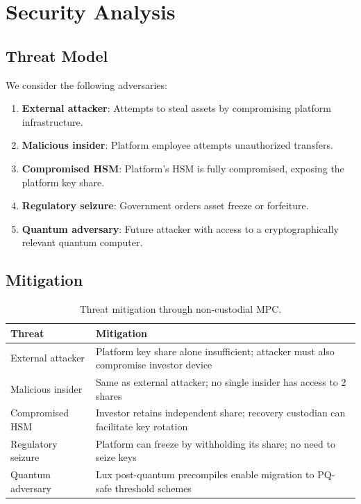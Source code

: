 \section{Security Analysis}
\label{sec:security}

\subsection{Threat Model}

We consider the following adversaries:

\begin{enumerate}[nosep]
  \item \textbf{External attacker}: Attempts to steal assets by compromising platform infrastructure.
  \item \textbf{Malicious insider}: Platform employee attempts unauthorized transfers.
  \item \textbf{Compromised HSM}: Platform's HSM is fully compromised, exposing the platform key share.
  \item \textbf{Regulatory seizure}: Government orders asset freeze or forfeiture.
  \item \textbf{Quantum adversary}: Future attacker with access to a cryptographically relevant quantum computer.
\end{enumerate}

\subsection{Mitigation}

\begin{table}[H]
\centering
\caption{Threat mitigation through non-custodial MPC.}
\label{tab:threats}
\begin{tabular}{lp{7cm}}
\toprule
\textbf{Threat} & \textbf{Mitigation} \\
\midrule
External attacker & Platform key share alone insufficient; attacker must also compromise investor device \\
Malicious insider & Same as external attacker; no single insider has access to 2 shares \\
Compromised HSM & Investor retains independent share; recovery custodian can facilitate key rotation \\
Regulatory seizure & Platform can freeze by withholding its share; no need to seize keys \\
Quantum adversary & Lux post-quantum precompiles enable migration to PQ-safe threshold schemes \cite{lux-mchain-mpc} \\
\bottomrule
\end{tabular}
\end{table}

